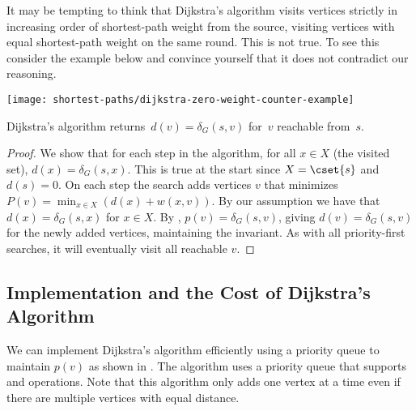 \begin{remark}
It may be tempting to think that Dijkstra's algorithm visits vertices
strictly in increasing order of shortest-path weight from the source,
visiting vertices with equal shortest-path weight on the same round.
This is not true. To see this consider the example below and convince
yourself that it does not contradict our reasoning.

\begin{center}
  \texttt{[image: shortest-paths/dijkstra-zero-weight-counter-example]}
\end{center}
\end{remark}

\begin{lemma}
  Dijkstra's algorithm returns~$d(v) = \delta_G(s,v)$ for~$v$ 
  reachable from~$s$.
\begin{proof}
  We show that for each step in the algorithm, for all $x \in X$ (the
  visited set), $d(x) = \delta_G(s,x)$.  This is true at the start
  since $X = \cset{s}$ and $d(s) = 0$.  On each step the search adds
  vertices $v$ that minimizes $P(v) = \min_{x \in X} (d(x) + w(x,v))$.
  By our assumption we have that $d(x) = \delta_G(s,x)$ for $x \in X$.
  By , $p(v) = \delta_G(s,v)$, giving $d(v) =
  \delta_G(s,v)$ for the newly added vertices, maintaining the
  invariant.  As with all priority-first searches, it will eventually
  visit all reachable $v$.
\end{proof}
\end{lemma}


\subsection{Implementation and the Cost of Dijkstra's Algorithm}

We can implement Dijkstra's algorithm efficiently using a priority
queue to maintain $p(v)$ as shown in .
%
The algorithm uses a priority queue that supports 
and  operations. 
%
Note that this algorithm only adds one vertex at a time even if
there are multiple vertices with equal distance.



